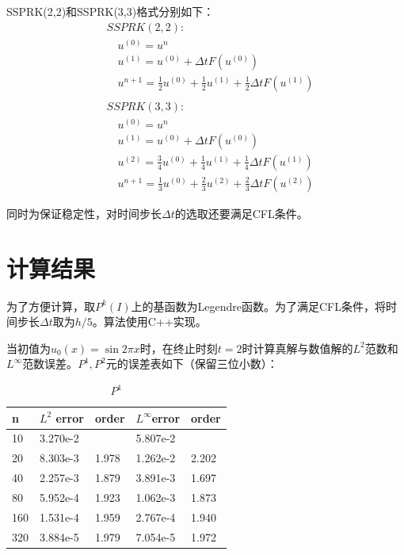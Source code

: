 \documentclass[12pt, a4paper]{ctexart}
\begin{document}
	SSPRK(2,2)和SSPRK(3,3)格式分别如下：
	\begin{align*}
	&SSPRK(2,2):\\
	& \quad u^{(0)} = u^n\\
	& \quad u^{(1)} = u^{(0)} + \Delta t F(u^{(0)})\\
	& \quad u^{n+1} = \frac{1}{2} u^{(0)} + \frac{1}{2} u^{(1)} + \frac{1}{2} \Delta t F(u^{(1)})\\
	&\\
	&SSPRK(3,3):\\
	& \quad u^{(0)} = u^n\\
	& \quad u^{(1)} = u^{(0)} + \Delta t F(u^{(0)})\\
	& \quad u^{(2)} = \frac{3}{4} u^{(0)} + \frac{1}{4} u^{(1)} + \frac{1}{4} \Delta t F(u^{(1)}) \\
	& \quad u^{n+1} = \frac{1}{3} u^{(0)} + \frac{2}{3} u^{(2)} + \frac{2}{3} \Delta t F(u^{(2)})
	\end{align*}
	
	同时为保证稳定性，对时间步长$\Delta t$的选取还要满足CFL条件。
	
	
	\section{计算结果}
	
	为了方便计算，取$P^k(I)$上的基函数为Legendre函数。为了满足CFL条件，将时间步长$\Delta t$取为$h/5$。算法使用C++实现。
	
	当初值为$u_0(x)= \sin 2 \pi x$时，在终止时刻$t=2$时计算真解与数值解的$L^2$范数和$L^\infty$范数误差。$P^1,P^2$元的误差表如下（保留三位小数）：
	\begin{table}[htbp]
		\centering
		\caption{$P^1$}
		\begin{tabular}{| p{40pt}<{\centering} | p{80pt}<{\centering} | p{60pt}<{\centering} || p{80pt}<{\centering} | p{60pt}<{\centering}|}
			\hline
			n & $L^2$ error & order & $L^\infty$error & order\\
			\hline
			10 & 3.270e-2 & & 5.807e-2 & \\
			\hline
			20 & 8.303e-3 & 1.978 & 1.262e-2 & 2.202\\
			\hline
			40 & 2.257e-3 & 1.879 & 3.891e-3 & 1.697\\
			\hline
			80 & 5.952e-4 & 1.923 & 1.062e-3 & 1.873\\
			\hline
			160 & 1.531e-4 & 1.959 & 2.767e-4 & 1.940\\
			\hline
			320 & 3.884e-5 & 1.979 & 7.054e-5 & 1.972\\
			\hline
		\end{tabular}
	\end{table}
\end{document}
